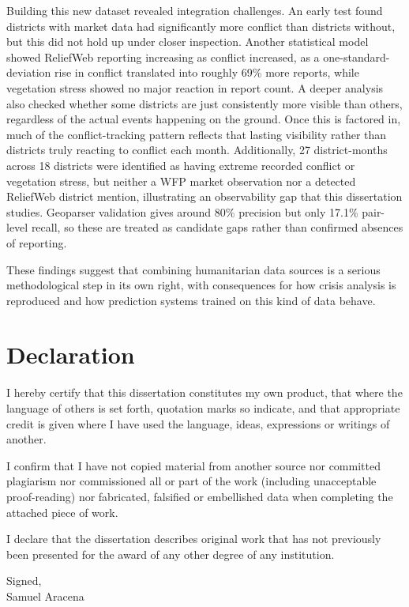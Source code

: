 \documentclass[12pt,a4paper]{article}
\begin{document}
Building this new dataset revealed integration challenges. An early test found districts with market data had significantly more conflict than districts without, but this did not hold up under closer inspection. Another statistical model showed ReliefWeb reporting increasing as conflict increased, as a one-standard-deviation rise in conflict translated into roughly 69\% more reports, while vegetation stress showed no major reaction in report count. A deeper analysis also checked whether some districts are just consistently more visible than others, regardless of the actual events happening on the ground. Once this is factored in, much of the conflict-tracking pattern reflects that lasting visibility rather than districts truly reacting to conflict each month. Additionally, 27 district-months across 18 districts were identified as having extreme recorded conflict or vegetation stress, but neither a WFP market observation nor a detected ReliefWeb district mention, illustrating an observability gap that this dissertation studies. Geoparser validation gives around 80\% precision but only 17.1\% pair-level recall, so these are treated as candidate gaps rather than confirmed absences of reporting.

These findings suggest that combining humanitarian data sources is a serious methodological step in its own right, with consequences for how crisis analysis is reproduced and how prediction systems trained on this kind of data behave.

\clearpage
\section*{Declaration}

I hereby certify that this dissertation constitutes my own product, that where the language of others is set forth, quotation marks so indicate, and that appropriate credit is given where I have used the language, ideas, expressions or writings of another.

I confirm that I have not copied material from another source nor committed plagiarism nor commissioned all or part of the work (including unacceptable proof-reading) nor fabricated, falsified or embellished data when completing the attached piece of work.

I declare that the dissertation describes original work that has not previously been presented for the award of any other degree of any institution.

\vspace{0.5cm}
\noindent Signed,\\
Samuel Aracena
\end{document}
